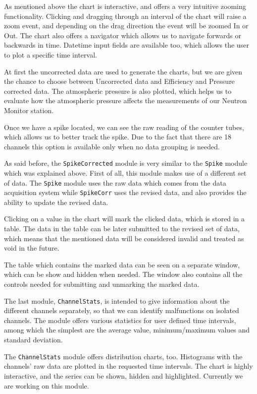 \documentclass[a4paper]{jpconf}
\begin{document}
As mentioned above the chart is interactive, and offers a very intuitive
zooming functionality. Clicking and dragging through an interval of the chart will
raise a zoom event, and depending on the drag direction the event will be zoomed In
or Out. The chart also offers a navigator which allows us to navigate forwards or
backwards in time. Datetime input fields are available too, which allows the user to
plot a specific time interval.

At first the uncorrected data are used to generate the charts, but we are given
the chance to choose between Uncorrected data and Efficiency and Pressure corrected
data. The atmospheric pressure is also plotted, which helps us to evaluate how the
atmospheric pressure affects the measurements of our Neutron Monitor station.

Once we have a spike located, we can see the raw reading of the counter tubes,
which allows us to better track the spike. Due to the fact that there are 18
channels this option is available only when no data grouping is needed.

As said before, the \texttt{SpikeCorrected} module is very similar to the
\texttt{Spike} module which was explained above. First of all, this module makes
use of a different set of data. The \texttt{Spike} module uses the raw data which
comes from the data acquisition system while \texttt{SpikeCorr} uses the
revised data, and also provides the ability to update the revised data.

Clicking on a value in the chart will mark the clicked data, which is
stored in a table. The data in the table can be later submitted to the revised
set of data, which means that the mentioned data will be considered invalid and
treated as void in the future.

The table which contains the marked data can be seen on a separate window, which
can be show and hidden when needed. The window also contains all the
controls needed for submitting and unmarking the marked data.

The last module, \texttt{ChannelStats}, is intended to give information about the
different channels separately, so that we can identify malfunctions on isolated
channels. The module offers various statistics for user defined time intervals,
among which the simplest are the average value, minimum/maximum
values and standard deviation.

The \texttt{ChannelStats} module offers distribution charts, too. Histograms with the
channels' raw data are plotted in the requested time intervals. The chart is
highly interactive, and the series can be shown, hidden and highlighted. Currently
we are working on this module.
\end{document}
